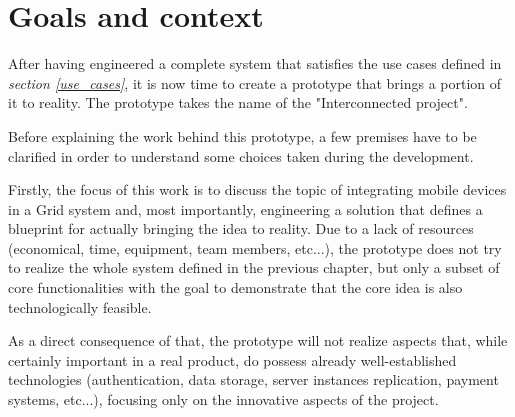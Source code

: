 \section{Goals and context}
After having engineered a complete system that satisfies the use cases defined in \textit{section \ref{use_cases}}, it is now time to create a prototype that brings a portion of it to reality. The prototype takes the name of the "Interconnected project".

Before explaining the work behind this prototype, a few premises have to be clarified in order to understand some choices taken during the development.

Firstly, the focus of this work is to discuss the topic of integrating mobile devices in a Grid system and, most importantly, engineering a solution that defines a blueprint for actually bringing the idea to reality. Due to a lack of resources (economical, time, equipment, team members, etc...), the prototype does not try to realize the whole system defined in the previous chapter, but only a subset of core functionalities with the goal to demonstrate that the core idea is also technologically feasible.

As a direct consequence of that, the prototype will not realize aspects that, while certainly important in a real product, do possess already well-established technologies (authentication, data storage, server instances replication, payment systems, etc...), focusing only on the innovative aspects of the project.
